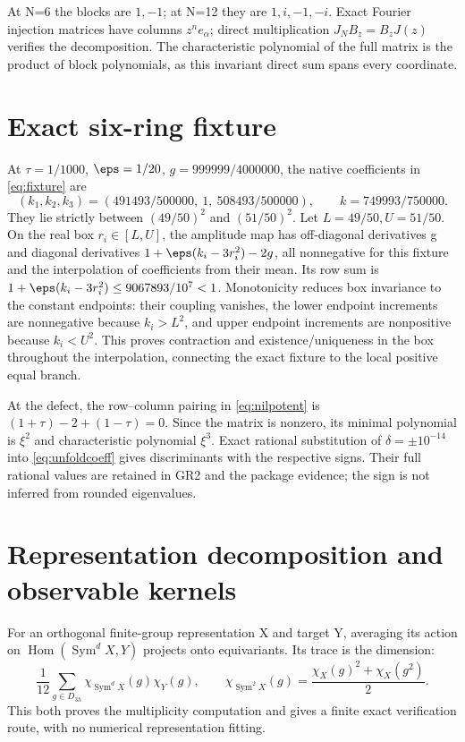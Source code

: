 At N=6 the blocks are \(1,-1\); at N=12 they are \(1,i,-1,-i\). Exact Fourier injection matrices have columns \(z^ne_\alpha\); direct multiplication \(J_NB_z=B_zJ(z)\) verifies the decomposition. The characteristic polynomial of the full matrix is the product of block polynomials, as this invariant direct sum spans every coordinate.

\section{Exact six-ring fixture}\label{app:fixture}
At \(\tau=1/1000\), \(\eps=1/20\), \(g=999999/4000000\), the native coefficients in \eqref{eq:fixture} are
\[
(k_1,k_2,k_3)=(491493/500000,\ 1,\ 508493/500000),\qquad
k=749993/750000.
\]
They lie strictly between \((49/50)^2\) and \((51/50)^2\).
Let \(L=49/50,U=51/50\). On the real box \(r_i\in[L,U]\), the amplitude map has off-diagonal derivatives g and diagonal derivatives
\(1+\eps(k_i-3r_i^2)-2g\), all nonnegative for this fixture and the interpolation of coefficients from their mean. Its row sum is
\(1+\eps(k_i-3r_i^2)\le9067893/10^7<1\).
Monotonicity reduces box invariance to the constant endpoints: their coupling vanishes, the lower endpoint increments are nonnegative because \(k_i>L^2\), and upper endpoint increments are nonpositive because \(k_i<U^2\). This proves contraction and existence/uniqueness in the box throughout the interpolation, connecting the exact fixture to the local positive equal branch.

At the defect, the row--column pairing in \eqref{eq:nilpotent} is
\((1+\tau)-2+(1-\tau)=0\). Since the matrix is nonzero, its minimal polynomial is \(\xi^2\) and characteristic polynomial \(\xi^3\). Exact rational substitution of \(\delta=\pm10^{-14}\) into \eqref{eq:unfoldcoeff} gives discriminants with the respective signs. Their full rational values are retained in GR2 and the package evidence; the sign is not inferred from rounded eigenvalues.

\section{Representation decomposition and observable kernels}\label{app:representations}
For an orthogonal finite-group representation X and target Y, averaging its action on \(\operatorname{Hom}(\operatorname{Sym}^dX,Y)\) projects onto equivariants. Its trace is the dimension:
\[
\frac1{12}\sum_{g\in D_{3h}}\chi_{\operatorname{Sym}^dX}(g)\chi_Y(g),\qquad
\chi_{\operatorname{Sym}^2X}(g)=\frac{\chi_X(g)^2+\chi_X(g^2)}2.
\]
This both proves the multiplicity computation and gives a finite exact verification route, with no numerical representation fitting.

